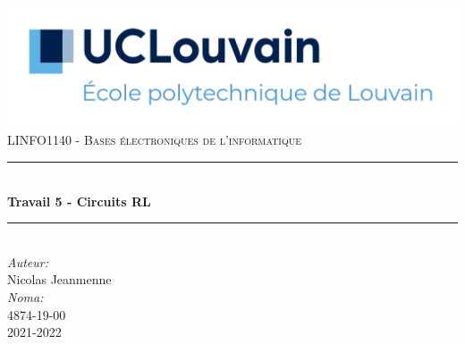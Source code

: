 \begin{titlepage}

    \newcommand{\HRule}{\rule{\linewidth}{0.5mm}} 							%
    \center 
     
    \includegraphics[width=\textwidth]{../pictures/UCLouvain-EPL.png}\\[1cm]
    
    \textsc{\large 
    LINFO1140 - Bases électroniques de l'informatique}\\[1cm] 										%
    \HRule \\[0.8cm]
    { \huge \bfseries Travail 5 - Circuits RL}\\[0.7cm]								%
    \HRule \\[2cm]
    \large
    \emph{Auteur:}\\
    Nicolas Jeanmenne\\[1.5cm]
    \emph{Noma:}\\
    4874-19-00\\[1.5cm]
    \vfill													%
    {\large 2021-2022}\\[5cm] 	%
    
    \vfill
\end{titlepage}